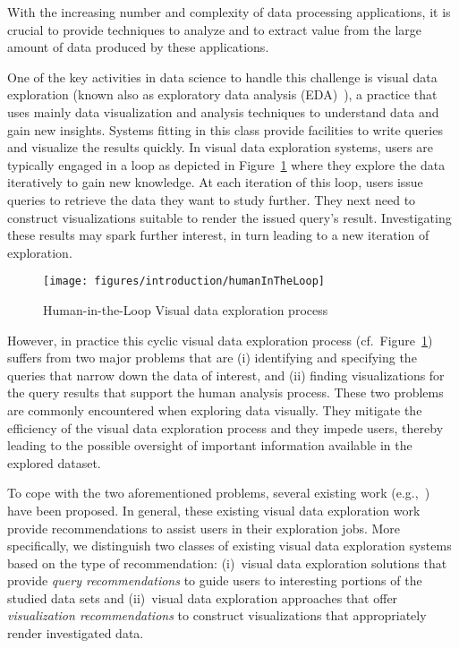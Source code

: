 \label{sec:context}
With the increasing number and complexity of data processing applications, it is crucial to provide techniques to analyze and to extract value from the large amount of data produced by these applications. 

One of the key activities in data science to handle this challenge is visual data exploration (known also as exploratory data analysis (EDA)~\cite{tukey77}), a practice that uses mainly data visualization and analysis techniques to understand data and gain new insights. Systems fitting in this class provide facilities to write queries and visualize the results quickly.
In visual data exploration systems, users are typically engaged in a loop as depicted in Figure~\ref{fig:hil} where they explore the data iteratively to gain new knowledge. At each iteration of this loop, users issue queries to retrieve the data they want to study further. They next need to construct visualizations suitable to render the issued query's result.  
Investigating these results may spark further interest, in turn leading to a new iteration of exploration. 
 \begin{figure}[t]
\centering
\texttt{[image: figures/introduction/humanInTheLoop]}
\caption{Human-in-the-Loop Visual data exploration process}
\label{fig:hil}
\end{figure}


However, in practice this cyclic visual data exploration process (cf.~Figure~\ref{fig:hil}) suffers from two major problems that are (i) identifying and specifying the queries that narrow down the data of interest, and (ii) finding visualizations for the query results that support the human analysis process.
These two problems are commonly encountered when exploring data visually. They mitigate the efficiency of the visual data exploration process and they impede users, thereby leading to the possible oversight of important information available in the explored dataset.

To cope with the two aforementioned problems, several existing work (e.g.,~\cite{Mackinlay:2007,Drosou2013,Vartak,Sellam:16,Tang:2017,Milo:2016,Mutlu:2016,Milo:2018,Wongsuphasawat2016,Wongsuphasawat:2017}) have been proposed. In general, these existing visual data exploration work provide recommendations to assist users in their exploration jobs.
More specifically, we distinguish two classes of existing visual data exploration systems based on the type of recommendation: (i)~visual data exploration solutions that provide \emph{query recommendations} to guide users to interesting portions of the studied data sets and (ii)~visual data exploration approaches that offer \emph{visualization recommendations} to construct visualizations that appropriately render investigated data.



